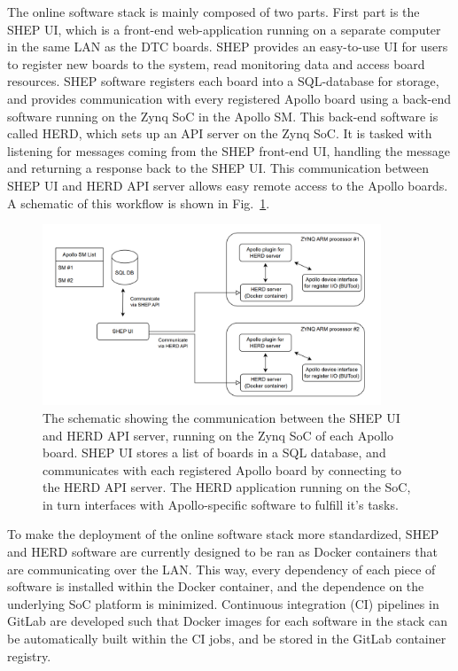 The online software stack is mainly composed of two parts. First part is the SHEP UI, which is a front-end web-application
running on a separate computer in the same LAN as the DTC boards. 
SHEP provides an easy-to-use UI for users to register new boards to the system,
read monitoring data and access board resources. SHEP software registers each board into a SQL-database for storage, and
provides communication with every registered Apollo board using a back-end software running on the Zynq SoC in the Apollo SM.
This back-end software is called HERD, which sets up an API server on the Zynq SoC. It is tasked with listening for messages 
coming from the SHEP front-end UI, handling the message and returning a response back to the SHEP UI. This communication
between SHEP UI and HERD API server allows easy remote access to the Apollo boards. A schematic of this workflow is shown in
Fig.~\ref{fig:shep_herd_schematic}.

\begin{figure}[htbp]
    \centering
    \includegraphics[width=0.9\textwidth]{TrackerUpgrade/SHEP_HERD.png}
    \caption{The schematic showing the communication between the SHEP UI and HERD API server, running on the Zynq SoC of each
    Apollo board. SHEP UI stores a list of boards in a SQL database, and communicates with each registered Apollo board by
    connecting to the HERD API server. The HERD application running on the SoC, in turn interfaces with Apollo-specific software
    to fulfill it's tasks.}
    \label{fig:shep_herd_schematic}
\end{figure}

To make the deployment of the online software stack more standardized, SHEP and HERD software are currently designed to be ran
as Docker containers that are communicating over the LAN. This way, every dependency of each piece of software is installed within
the Docker container, and the dependence on the underlying SoC platform is minimized. Continuous integration (CI) pipelines in
GitLab are developed such that Docker images for each software in the stack can be automatically built within the CI jobs, and
be stored in the GitLab container registry.

\clearpage
